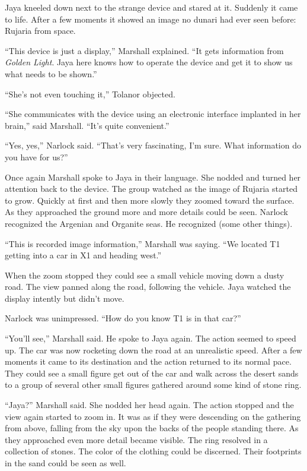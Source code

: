 Jaya kneeled down next to the strange device and stared at it. Suddenly it came to life. After a
few moments it showed an image no dunari had ever seen before: Rujaria from space.

``This device is just a display,'' Marshall explained. ``It gets information from \textit{Golden
  Light}. Jaya here knows how to operate the device and get it to show us what needs to be
shown.''

``She's not even touching it,'' Tolanor objected.

``She communicates with the device using an electronic interface implanted in her brain,'' said
Marshall. ``It's quite convenient.''

``Yes, yes,'' Narlock said. ``That's very fascinating, I'm sure. What information do you have
for us?''

Once again Marshall spoke to Jaya in their language. She nodded and turned her attention back to
the device. The group watched as the image of Rujaria started to grow. Quickly at first and then
more slowly they zoomed toward the surface. As they approached the ground more and more details
could be seen. Narlock recognized the Argenian and Organite seas. He recognized (some other
things).

``This is recorded image information,'' Marshall was saying. ``We located T1 getting into a car
in X1 and heading west.''

When the zoom stopped they could see a small vehicle moving down a dusty road. The view panned
along the road, following the vehicle. Jaya watched the display intently but didn't move.

Narlock was unimpressed. ``How do you know T1 is in that car?''

``You'll see,'' Marshall said. He spoke to Jaya again. The action seemed to speed up. The car
was now rocketing down the road at an unrealistic speed. After a few moments it came to its
destination and the action returned to its normal pace. They could see a small figure get out of
the car and walk across the desert sands to a group of several other small figures gathered
around some kind of stone ring.

``Jaya?'' Marshall said. She nodded her head again. The action stopped and the view again
started to zoom in. It was as if they were descending on the gathering from above, falling from
the sky upon the backs of the people standing there. As they approached even more detail became
visible. The ring resolved in a collection of stones. The color of the clothing could be
discerned. Their footprints in the sand could be seen as well.

